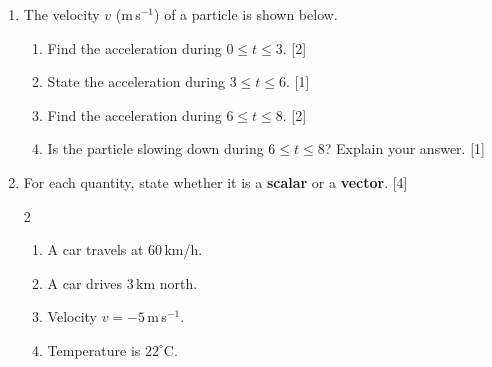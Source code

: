 \documentclass[12pt, twoside]{article}
\begin{document}
\begin{enumerate}[itemsep=0.25cm]
\newpage

\item The velocity $v$ (m\,s$^{-1}$) of a particle is shown below.

\begin{center}
\vspace{-0.3cm}
\vspace{-0.3cm}
\end{center}

\begin{enumerate}[itemsep=0.15cm]
  \item Find the acceleration during $0 \leq t \leq 3$. \hfill [2]
  \item State the acceleration during $3 \leq t \leq 6$. \hfill [1]
  \item Find the acceleration during $6 \leq t \leq 8$. \hfill [2]
  \item Is the particle slowing down during $6 \leq t \leq 8$?
        Explain your answer. \hfill [1]
\end{enumerate}

\medskip

\item For each quantity, state whether it is a \textbf{scalar} or a \textbf{vector}. \hfill [4]
\begin{multicols}{2}
\begin{enumerate}[itemsep=0.1cm]
  \item A car travels at 60\,km/h.
  \item A car drives 3\,km north.
  \item Velocity $v = -5$\,m\,s$^{-1}$.
  \item Temperature is $22^\circ$C.
\end{enumerate}
\end{multicols}


\end{enumerate}
\end{document}
